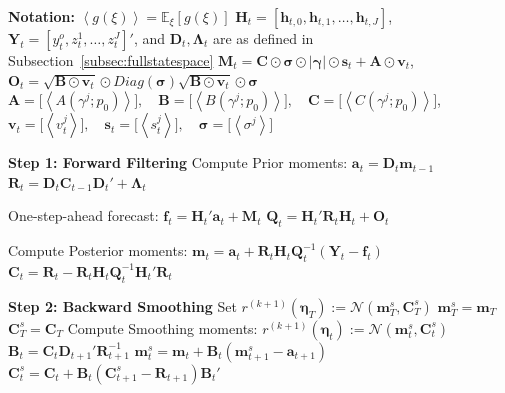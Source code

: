\documentclass[APA,STIX1COL]{WileyNJD-v2}
\begin{document}
\begin{algorithm}
\caption{VB-Filtering and VB-Smoothing}
\label{alg:Alg4}
\begin{algorithmic}

\State \textbf{Notation:}
\State $\left\langle g(\xi) \right\rangle = \mathbb{E}_\xi\left[ g(\xi) \right]$
\State  $\mathbf{H}_t = [\mathbf{h}_{t,0}, \mathbf{h}_{t,1}, \ldots, \mathbf{h}_{t,J}]$, $\mathbf{Y}_t = [y_t^o, z_t^1, \ldots, z_t^J]'$, and $\mathbf{D}_t, \boldsymbol{\Lambda}_t$ are as defined in Subsection~\ref{subsec:fullstatespace}
\State $\mathbf{M}_t= \mathbf{C} \odot  \mathbf{\sigma} \odot | \mathbf{\gamma} | \odot \mathbf{s}_t + \mathbf{A} \odot \mathbf{v}_t$, \quad $\mathbf{O}_t= \sqrt{\mathbf{B} \odot \mathbf{v}_t} \odot Diag
(\mathbf{\sigma}) \sqrt{\mathbf{B} \odot \mathbf{v}_t} \odot \mathbf{\sigma}$
\State  \(
\mathbf{A} = \big[ \left\langle A(\gamma^j;p_0)  \right\rangle \big], \quad \mathbf{B} = \big[ \left\langle B(\gamma^j;p_0)  \right\rangle \big], \quad \mathbf{C} = \big[ \left\langle C(\gamma^j;p_0)  \right\rangle \big] \), 
\State \( \mathbf{v}_t = \big[ \left\langle v^j_t  \right\rangle \big], \quad  \mathbf{s}_t = \big[ \left\langle
s^j_t  \right\rangle \big] , \quad \mathbf{\sigma} = \big[ \left\langle \sigma^j  \right\rangle \big]
\)
\State {} \odot {}
\vspace{0.1cm}
\hline
\vspace{0.1cm}

\State \textbf{Step 1: Forward Filtering}
    \State Compute Prior moments:
    \State $\mathbf{a}_t = \mathbf{D}_t \mathbf{m}_{t-1}$
    \State $\mathbf{R}_t = \mathbf{D}_t \mathbf{C}_{t-1} \mathbf{D}_t' +  \boldsymbol{\Lambda}_t$

    \State One-step-ahead forecast:
    \State $\mathbf{f}_t = \mathbf{H}_t'\mathbf{a}_t + \mathbf{M}_t$
    \State $\mathbf{Q}_t = \mathbf{H}_t'\mathbf{R}_t\mathbf{H}_t + \mathbf{O}_t$
    
    \State Compute Posterior moments:
    \State $\mathbf{m}_t = \mathbf{a}_t + \mathbf{R}_t \mathbf{H}_t \mathbf{Q}_t^{-1}(\mathbf{Y}_t - \mathbf{f}_t)$
    \State $\mathbf{C}_t = \mathbf{R}_t - \mathbf{R}_t \mathbf{H}_t \mathbf{Q}_t^{-1} \mathbf{H}_t' \mathbf{R}_t$
\EndFor

\State \textbf{Step 2: Backward Smoothing}
        \State Set $r^{(k+1)}(\boldsymbol{\eta}_T) := \mathcal{N}(\mathbf{m}_T^s, \mathbf{C}_T^s)$
        \State $\mathbf{m}_T^s = \mathbf{m}_T$
        \State $\mathbf{C}_T^s = \mathbf{C}_T$
    \Else
        \State Compute Smoothing moments:
        \State $r^{(k+1)}(\boldsymbol{\eta}_t) := \mathcal{N}(\mathbf{m}_t^s, \mathbf{C}_t^s)$
        \State $\mathbf{B}_t = \mathbf{C}_t \mathbf{D}_{t+1}' \mathbf{R}_{t+1}^{-1}$
        \State $\mathbf{m}_t^s = \mathbf{m}_t + \mathbf{B}_t (\mathbf{m}_{t+1}^s - \mathbf{a}_{t+1})$
        \State $\mathbf{C}_t^s = \mathbf{C}_t + \mathbf{B}_t (\mathbf{C}_{t+1}^s - \mathbf{R}_{t+1}) \mathbf{B}_t'$
    \EndIf
\EndFor


\end{algorithmic}
\end{algorithm}
\end{document}
